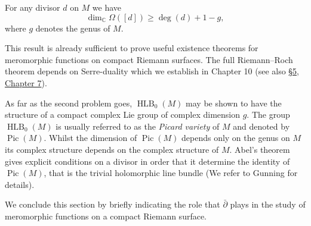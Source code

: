 For any divisor $d$ on $M$ we have
\[ \dim_{\mathbb C}\Omega([d])\geq\deg(d)+1-g, \]
where $g$ denotes the genus of $M$.

This result is already sufficient to prove useful existence theorems for meromorphic functions on compact Riemann surfaces. The full Riemann--Roch theorem depends on Serre-duality which we establish in Chapter 10 (see also \hyperref[sec:7:5]{\S5, Chapter 7}).

As far as the second problem goes, $\operatorname{HLB}_0(M)$ may be shown to have the structure of a compact complex Lie group of complex dimension $g$. The group $\operatorname{HLB}_0(M)$ is usually referred to as the \emph{Picard variety} of $M$ and denoted by $\operatorname{Pic}(M)$. Whilst the dimension of $\operatorname{Pic}(M)$ depends only on the genus on $M$ its complex structure depends on the complex structure of $M$. Abel's theorem gives explicit conditions on a divisor in order that it determine the identity of $\operatorname{Pic}(M)$, that is the trivial holomorphic line bundle (We refer to Gunning \cite{bib:I:gunning-r-c:1} for details).

We conclude this section by briefly indicating the role that $\bar\partial$ plays in the study of meromorphic functions on a compact Riemann surface.

